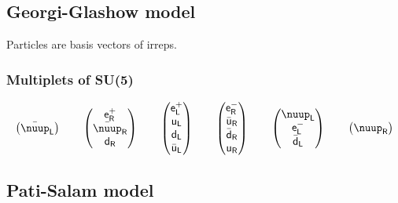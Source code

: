 \documentclass[english, fleqn]{beamer}
\begin{document}
\subsection{Georgi-Glashow model}

\begin{frame}
    Particles are basis vectors of irreps.
\end{frame}

\begin{frame}
    \frametitle{Multiplets of SU(5)}
    \[
        \begin{pmatrix}
            \bar\nuup_\mathsf L
        \end{pmatrix}
        \qquad
        \begin{pmatrix}
            \mathsf e^+_\mathsf R \\
            \bar\nuup_\mathsf R \\
            \mathsf d_\mathsf R
        \end{pmatrix}
        \qquad
        \begin{pmatrix}
            \mathsf e^+_\mathsf L \\
            \mathsf u_\mathsf L \\
            \mathsf d_\mathsf L \\
            \bar{\mathsf u}_\mathsf L
        \end{pmatrix}
        \qquad
        \begin{pmatrix}
            \mathsf e^-_\mathsf R \\
            \bar{\mathsf u}_\mathsf R \\
            \bar{\mathsf d}_\mathsf R \\
            \mathsf u_\mathsf R
        \end{pmatrix}
        \qquad
        \begin{pmatrix}
            \nuup_\mathsf L \\
            \mathsf e^-_\mathsf L \\
            \bar{\mathsf d}_\mathsf L
        \end{pmatrix}
        \qquad
        \begin{pmatrix}
            \nuup_\mathsf R
        \end{pmatrix}
    \]

    \parencite{Baez/Algebra_GUT}
\end{frame}

\subsection{Pati-Salam model}
\end{document}
